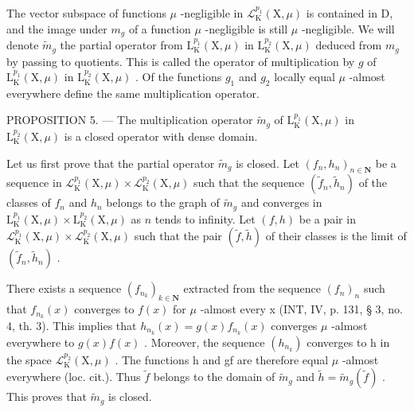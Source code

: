 The vector subspace of functions \(\mu\) -negligible in \(\mathcal{L}_{\mathrm{K}}^{p_1}(\mathrm{X},\mu)\) is contained in D, and the image under \(m_g\) of a function \(\mu\) -negligible is still \(\mu\) -negligible. We will denote \(\tilde{m}_g\) the partial operator from \(\mathrm{L}_{\mathrm{K}}^{p_1}(\mathrm{X},\mu)\) in \(\mathrm{L}_{\mathrm{K}}^{p_2}(\mathrm{X},\mu)\) deduced from \(m_g\) by passing to quotients. This is called the operator of multiplication by \(g\) of \(\mathrm{L}_{\mathrm{K}}^{p_1}(\mathrm{X},\mu)\) in \(\mathrm{L}_{\mathrm{K}}^{p_2}(\mathrm{X},\mu)\) . Of the functions \(g_1\) and \(g_2\) locally equal \(\mu\) -almost everywhere define the same multiplication operator.

PROPOSITION 5. — The multiplication operator \(\widetilde{m}_{g}\) of \(\mathrm{L}_{\mathrm{K}}^{p_{1}}(\mathrm{X},\mu)\) in \(\mathrm{L}_{\mathrm{K}}^{p_{2}}(\mathrm{X},\mu)\) is a closed operator with dense domain.

Let us first prove that the partial operator \(\widetilde{m}_g\) is closed. Let \((f_n, h_n)_{n \in \mathbf{N}}\) be a sequence in \(\mathcal{L}_{\mathrm{K}}^{p_1}(\mathrm{X}, \mu) \times \mathcal{L}_{\mathrm{K}}^{p_2}(\mathrm{X}, \mu)\) such that the sequence \((\widetilde{f}_n, \widetilde{h}_n)\) of the classes of \(f_n\) and \(h_n\) belongs to the graph of \(\widetilde{m}_g\) and converges in \(\mathrm{L}_{\mathrm{K}}^{p_1}(\mathrm{X}, \mu) \times \mathrm{L}_{\mathrm{K}}^{p_2}(\mathrm{X}, \mu)\) as \(n\) tends to infinity. Let \((f, h)\) be a pair in \(\mathcal{L}_{\mathrm{K}}^{p_1}(\mathrm{X}, \mu) \times \mathcal{L}_{\mathrm{K}}^{p_2}(\mathrm{X}, \mu)\) such that the pair \((\widetilde{f}, \widetilde{h})\) of their classes is the limit of \((\widetilde{f}_n, \widetilde{h}_n)\) .

There exists a sequence \((f_{n_{k}})_{k\in\mathbf{N}}\) extracted from the sequence \((f_{n})_{n}\) such that \(f_{n_{k}}(x)\) converges to \(f(x)\) for \(\mu\) -almost every x (INT, IV, p. 131, § 3, no. 4, th. 3). This implies that \(h_{n_{k}}(x)=g(x)f_{n_{k}}(x)\) converges \(\mu\) -almost everywhere to \(g(x)f(x)\) . Moreover, the sequence \((h_{n_{k}})\) converges to h in the space \(\mathcal{L}_{\mathrm{K}}^{p_{2}}(\mathrm{X},\mu)\) . The functions h and gf are therefore equal \(\mu\) -almost everywhere (loc. cit.). Thus \(\widetilde{f}\) belongs to the domain of \(\widetilde{m}_{g}\) and \(\widetilde{h}=\widetilde{m}_{g}(\widetilde{f})\) . This proves that \(\widetilde{m}_{g}\) is closed.

